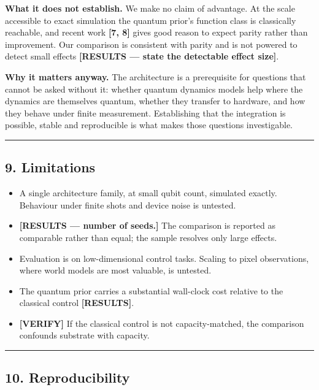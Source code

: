 \documentclass[
  11pt]{article}
\providecommand{\tightlist}{%
  \setlength{\itemsep}{0pt}\setlength{\parskip}{0pt}}
\begin{document}
\textbf{What it does not establish.} We make no claim of advantage. At
the scale accessible to exact simulation the quantum prior's function
class is classically reachable, and recent work \textbf{{[}7, 8{]}}
gives good reason to expect parity rather than improvement. Our
comparison is consistent with parity and is not powered to detect small
effects \textbf{{[}RESULTS --- state the detectable effect size{]}}.

\textbf{Why it matters anyway.} The architecture is a prerequisite for
questions that cannot be asked without it: whether quantum dynamics
models help where the dynamics are themselves quantum, whether they
transfer to hardware, and how they behave under finite measurement.
Establishing that the integration is possible, stable and reproducible
is what makes those questions investigable.

\begin{center}\rule{0.5\linewidth}{0.5pt}\end{center}

\hypertarget{limitations}{%
\subsection{9. Limitations}\label{limitations}}

\begin{itemize}
\tightlist
\item
  A single architecture family, at small qubit count, simulated exactly.
  Behaviour under finite shots and device noise is untested.
\item
  \textbf{{[}RESULTS --- number of seeds.{]}} The comparison is reported
  as comparable rather than equal; the sample resolves only large
  effects.
\item
  Evaluation is on low-dimensional control tasks. Scaling to pixel
  observations, where world models are most valuable, is untested.
\item
  The quantum prior carries a substantial wall-clock cost relative to
  the classical control \textbf{{[}RESULTS{]}}.
\item
  \textbf{{[}VERIFY{]}} If the classical control is not
  capacity-matched, the comparison confounds substrate with capacity.
\end{itemize}

\begin{center}\rule{0.5\linewidth}{0.5pt}\end{center}

\hypertarget{reproducibility}{%
\subsection{10. Reproducibility}\label{reproducibility}}
\end{document}

